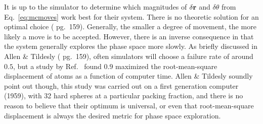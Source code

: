 It is up to the simulator to determine which magnitudes of $\delta\mathbf{r}$ and $\delta\theta$ from Eq.\ \ref{eq:mcmoves}  work best for their system. There is no theoretic solution for an optimal choice (\cite{allenbook} pg.\ 159). Generally, the smaller a degree of movement, the more likely a move is to be accepted. However, there is an inverse consequence in that the system generally explores the phase space more slowly. 
As briefly discussed in Allen \& Tildesly (\cite{allenbook} pg.\ 159), often simulators will choose a failure rate of around $0.5$, but a study by Ref.\  \cite{wood1959} found $0.9$ maximized the root-mean-square displacement of atoms as a function of computer time. Allen \& Tildesly soundly point out though, this study was carried out on a first generation computer (1959), with 32 hard spheres at a particular packing fraction, and there is no reason to believe that their optimum is universal, or even that root-mean-square displacement is always the desired metric for phase space exploration.


